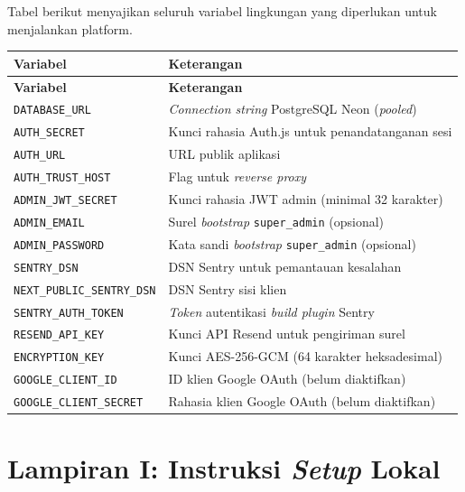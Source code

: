 Tabel berikut menyajikan seluruh variabel lingkungan yang diperlukan untuk menjalankan platform.

\begin{longtable}{@{}l p{8cm}@{}}
  \toprule
  \textbf{Variabel} & \textbf{Keterangan} \\
  \midrule
  \endfirsthead
  \toprule
  \textbf{Variabel} & \textbf{Keterangan} \\
  \midrule
  \endhead
  \bottomrule
  \endfoot
  \texttt{DATABASE\_URL} & \textit{Connection string} PostgreSQL Neon (\textit{pooled}) \\
  \texttt{AUTH\_SECRET} & Kunci rahasia Auth.js untuk penandatanganan sesi \\
  \texttt{AUTH\_URL} & URL publik aplikasi \\
  \texttt{AUTH\_TRUST\_HOST} & Flag untuk \textit{reverse proxy} \\
  \texttt{ADMIN\_JWT\_SECRET} & Kunci rahasia JWT admin (minimal 32 karakter) \\
  \texttt{ADMIN\_EMAIL} & Surel \textit{bootstrap} \texttt{super\_admin} (opsional) \\
  \texttt{ADMIN\_PASSWORD} & Kata sandi \textit{bootstrap} \texttt{super\_admin} (opsional) \\
  \texttt{SENTRY\_DSN} & DSN Sentry untuk pemantauan kesalahan \\
  \texttt{NEXT\_PUBLIC\_SENTRY\_DSN} & DSN Sentry sisi klien \\
  \texttt{SENTRY\_AUTH\_TOKEN} & \textit{Token} autentikasi \textit{build plugin} Sentry \\
  \texttt{RESEND\_API\_KEY} & Kunci API Resend untuk pengiriman surel \\
  \texttt{ENCRYPTION\_KEY} & Kunci AES-256-GCM (64 karakter heksadesimal) \\
  \texttt{GOOGLE\_CLIENT\_ID} & ID klien Google OAuth (belum diaktifkan) \\
  \texttt{GOOGLE\_CLIENT\_SECRET} & Rahasia klien Google OAuth (belum diaktifkan) \\
\end{longtable}

\section*{Lampiran I: Instruksi \textit{Setup} Lokal}

